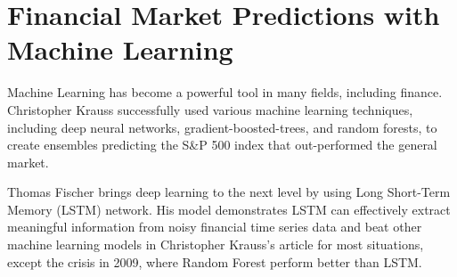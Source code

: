 \section{Financial Market Predictions with Machine Learning}
Machine Learning has become a powerful tool in many fields, including finance. Christopher Krauss successfully used various machine learning techniques, including deep neural networks, gradient-boosted-trees, and random forests, to create ensembles predicting the S\&P 500 index that out-performed the general market. \cite{KRAUSS2017689} 
\par

Thomas Fischer brings deep learning to the next level by using Long Short-Term Memory (LSTM) network.\cite{FISCHER2018654} His model demonstrates LSTM can effectively extract meaningful information from noisy financial time series data and beat other machine learning models in  Christopher Krauss's article  \cite{KRAUSS2017689} for most situations, except the crisis in 2009, where Random Forest perform better than LSTM.